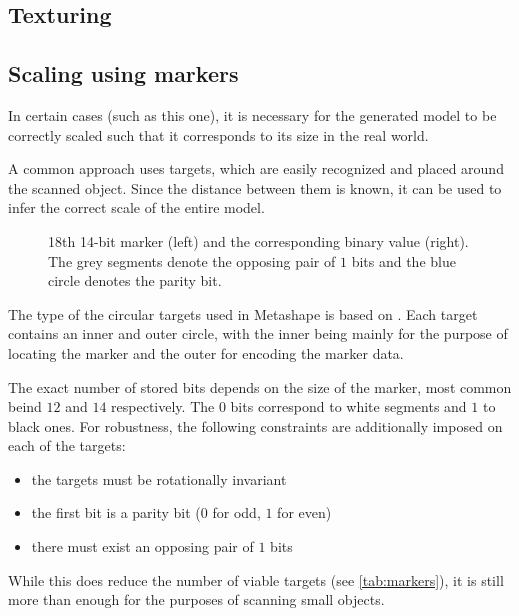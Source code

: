 \subsection{Texturing}
%

\subsection{Scaling using markers}
In certain cases (such as this one), it is necessary for the generated model to be correctly scaled such that it corresponds to its size in the real world.

A common approach uses targets, which are easily recognized and placed around the scanned object.
Since the distance between them is known, it can be used to infer the correct scale of the entire model.

\begin{figure}
\centering
	
	\caption{18th 14-bit marker (left) and the corresponding binary value (right). The grey segments denote the opposing pair of $1$ bits and the blue circle denotes the parity bit. }
\end{figure}

The type of the circular targets used in Metashape is based on \citet{schneider19913,borisPatent}.
Each target contains an inner and outer circle, with the inner being mainly for the purpose of locating the marker and the outer for encoding the marker data.

The exact number of stored bits depends on the size of the marker, most common beind $12$ and $14$ respectively.
The $0$ bits correspond to white segments and $1$ to black ones.
For robustness, the following constraints are additionally imposed on each of the targets:

\begin{itemize}
	\item the targets must be rotationally invariant
	\item the first bit is a parity bit ($0$ for odd, $1$ for even)
	\item there must exist an opposing pair of $1$ bits
\end{itemize}

While this does reduce the number of viable targets (see \cref{tab:markers}), it is still more than enough for the purposes of scanning small objects.

